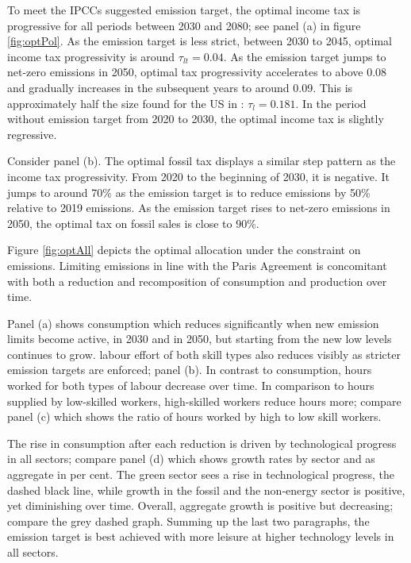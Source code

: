 To meet the IPCCs suggested emission target, the optimal income tax is progressive for all periods between 2030 and 2080; see panel (a) in figure \ref{fig:optPol}. As the emission target is less strict, between 2030 to 2045, optimal income tax progressivity is around $\tau_{lt}=0.04$. As the emission target jumps to net-zero emissions in 2050, optimal tax progressivity accelerates to above 0.08 and gradually increases in the subsequent years to around 0.09. This is approximately half the size found for the US in \cite{Heathcote2017OptimalFramework}: $\tau_{l}=0.181$. 
In the period without emission target from 2020 to 2030, the optimal income tax is slightly regressive.

Consider panel (b). The optimal fossil tax displays a similar step pattern as the income tax progressivity. From 2020 to the beginning of 2030, it is negative. It jumps to around 70\% as the emission target is to reduce emissions by 50\% relative to 2019 emissions. As the emission target rises  to net-zero emissions in 2050, the optimal tax on fossil sales is close to 90\%. 

Figure \ref{fig:optAll} depicts the optimal allocation under the constraint on emissions. Limiting emissions in line with the Paris Agreement is concomitant with both a reduction and recomposition of consumption and production over time. 

Panel (a) shows consumption which reduces significantly when new emission limits become active, in 2030 and in 2050, but starting from the new low levels continues to grow. labour effort of both skill types also reduces visibly as stricter emission targets are enforced; panel (b). In contrast to consumption, hours worked for both types of labour decrease over time. In comparison to hours supplied by low-skilled workers, high-skilled workers reduce hours more; compare panel (c) which shows the ratio of hours worked by high to low skill workers. 

The rise in consumption after each reduction is driven by technological progress in all sectors; compare panel (d) which shows growth rates by sector and as aggregate in per cent. 
The green sector sees a rise in technological progress, the dashed black line, while growth in the fossil and the non-energy sector is positive, yet diminishing over time. Overall, aggregate growth is positive but decreasing; compare the grey dashed graph. 
Summing up the last two paragraphs, the emission target is best achieved with more leisure at higher technology levels in all sectors. 

